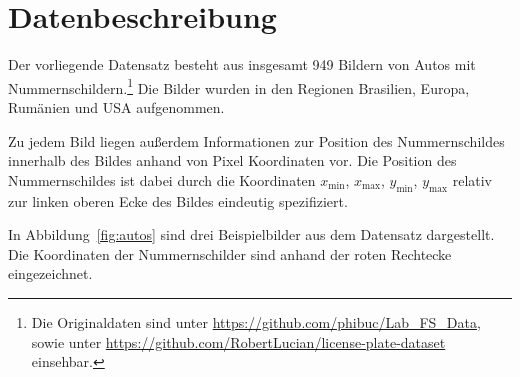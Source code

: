 \section{Datenbeschreibung}
\label{sec:Datenbeschreibung}

Der vorliegende Datensatz besteht aus insgesamt 949 Bildern von Autos mit
Nummernschildern.\footnote{Die Originaldaten sind unter \url{https://github.com/phibuc/Lab_FS_Data},
    sowie unter \url{https://github.com/RobertLucian/license-plate-dataset}
    einsehbar.}
Die Bilder wurden in den Regionen Brasilien, Europa, Rum\"anien und USA
aufgenommen.

Zu jedem Bild liegen au{\ss}erdem Informationen zur Position
des Nummernschildes innerhalb des Bildes anhand von Pixel Koordinaten vor.
Die Position des Nummernschildes ist dabei durch die Koordinaten
$x_{\text{min}}$, $x_{\text{max}}$, $y_{\text{min}}$, $y_{\text{max}}$
relativ zur linken oberen Ecke des Bildes eindeutig spezifiziert.

In Abbildung~\ref{fig:autos} sind drei Beispielbilder aus dem Datensatz
dargestellt. Die Koordinaten der Nummernschilder sind anhand der
roten Rechtecke eingezeichnet.

